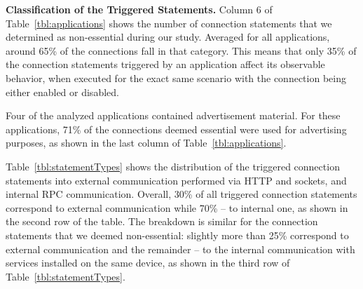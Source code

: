 \begin{table}[t]
\caption{Communication Types.}
\label{tbl:statementTypes}
\centering
\end{table}


\vspace{0.1in}
\noindent 
{\bf Classification of the Triggered Statements.}
Column 6 of Table~\ref{tbl:applications} shows the number of connection statements that we determined as non-essential during our study. 
Averaged for all applications, around 65\% of the connections fall in that category. 
This means that only 35\% of the connection statements triggered by an application affect its observable behavior, 
when executed for the exact same scenario with the connection being either enabled or disabled. 

Four of the analyzed applications contained advertisement material. For these applications, 71\% of the connections deemed  essential were used for advertising purposes, as shown in the last column of Table~\ref{tbl:applications}.

Table~\ref{tbl:statementTypes} shows the distribution of the triggered connection statements 
into external communication performed via HTTP and sockets, and internal RPC communication. 
Overall, 30\% of all triggered connection statements correspond to external communication while 70\% -- to
internal one, as shown in the second row of the table.
The breakdown is similar for the connection statements that we deemed non-essential: slightly more than 25\%
correspond to external communication and the remainder -- to the internal communication with services installed on the same device, as shown in the third row of Table~\ref{tbl:statementTypes}.

